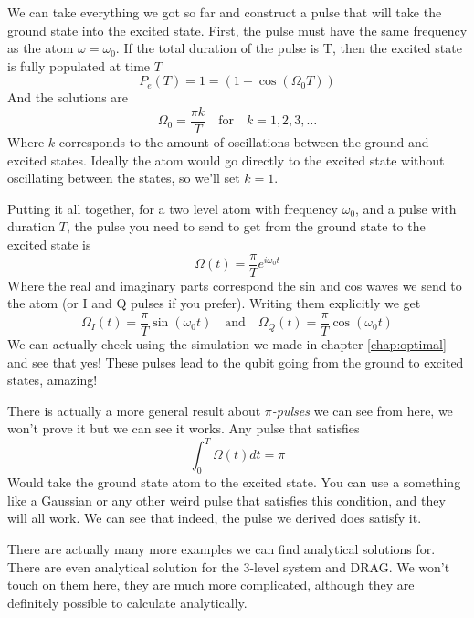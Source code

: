 We can take everything we got so far and construct a pulse that will take the ground state into the excited state. First, the pulse must have the same frequency as the atom $\omega = \omega_0$. If the total duration of the pulse is T, then the excited state is fully populated at time $T$
\[
    P_e (T) = 1 =  (1 - \cos  (\Omega_0 T))
\]
And the solutions are
\[
    \Omega_0 = \frac{\pi k}{T} \quad \text{for} \quad k = 1, 2, 3, \dots
\]
Where $k$ corresponds to the amount of oscillations between the ground and excited states. Ideally the atom would go directly to the excited state without oscillating between the states, so we'll set $k = 1$.

Putting it all together, for a two level atom with frequency $\omega_0$, and a pulse with duration $T$, the pulse you need to send to get from the ground state to the excited state is
\[
    \boxed{\Omega (t) = \frac{\pi}{T} e^{i \omega_0 t}}
\]
Where the real and imaginary parts correspond the sin and cos waves we send to the atom (or I and Q pulses if you prefer). Writing them explicitly we get
\[
    \boxed{\Omega_I  (t) = \frac{\pi }{T} \sin  (\omega_0 t)} \quad \text{and} \quad \boxed{\Omega_Q  (t) = \frac{\pi}{T} \cos  (\omega_0 t)}
\]
We can actually check using the simulation we made in chapter \ref{chap:optimal} and see that yes! These pulses lead to the qubit going from the ground to excited states, amazing!

There is actually a more general result about \textit{$\pi$-pulses} we can see from here, we won't prove it but we can see it works. Any pulse that satisfies
\[
    \int_0^T \Omega (t) dt = \pi
\]
Would take the ground state atom to the excited state. You can use a something like a Gaussian or any other weird pulse that satisfies this condition, and they will all work. We can see that indeed, the pulse we derived does satisfy it.

There are actually many more examples we can find analytical solutions for. There are even analytical solution for the 3-level system and DRAG. We won't touch on them here, they are much more complicated, although they are definitely possible to calculate analytically.